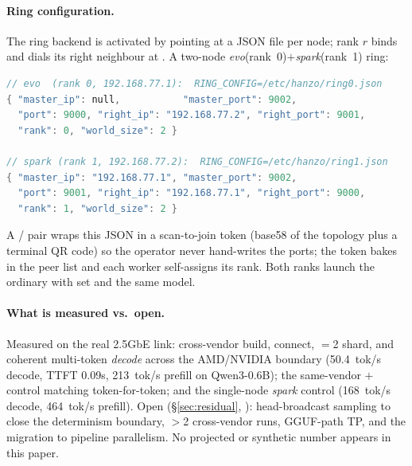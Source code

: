\documentclass[11pt]{article}
\begin{document}
\paragraph{Ring configuration.} The ring backend is activated by pointing  at a JSON
file per node; rank $r$ binds  and dials its right neighbour at
. A two-node \emph{evo}(rank~0)$+$\emph{spark}(rank~1) ring:

\begin{lstlisting}[language=Rust,caption={\code{RING\_CONFIG} for a 2-node cross-vendor ring. Rank~0
(evo) listens on 9000 and dials spark; rank~1 (spark) listens on 9001 and dials back to evo, closing the
ring.},label={lst:ring}]
// evo  (rank 0, 192.168.77.1):  RING_CONFIG=/etc/hanzo/ring0.json
{ "master_ip": null,           "master_port": 9002,
  "port": 9000, "right_ip": "192.168.77.2", "right_port": 9001,
  "rank": 0, "world_size": 2 }

// spark (rank 1, 192.168.77.2):  RING_CONFIG=/etc/hanzo/ring1.json
{ "master_ip": "192.168.77.1", "master_port": 9002,
  "port": 9001, "right_ip": "192.168.77.1", "right_port": 9000,
  "rank": 1, "world_size": 2 }
\end{lstlisting}

\noindent A  /  pair wraps this JSON in a
scan-to-join token (base58 of the topology plus a terminal QR code) so the operator never hand-writes the
ports; the token bakes in the peer list and each worker self-assigns its rank. Both ranks launch the
ordinary  with  set and the same model.

\paragraph{What is measured vs.\ open.} Measured on the real 2.5GbE link: cross-vendor build, connect,
$=$2 shard, and coherent multi-token \emph{decode} across the AMD/NVIDIA boundary
(50.4~tok/s decode, TTFT 0.09s, 213~tok/s prefill on Qwen3-0.6B); the same-vendor $+$
control matching token-for-token; and the single-node \emph{spark} control (168~tok/s decode, 464~tok/s
prefill). Open (\S\ref{sec:residual}, \cite{openproblems}): head-broadcast sampling to close the
determinism boundary, $>$2 cross-vendor runs, GGUF-path TP, and the migration to pipeline
parallelism. No projected or synthetic number appears in this paper.
\end{document}

